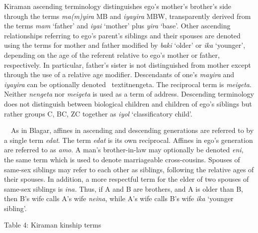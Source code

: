 Kiraman ascending terminology distinguishes ego{\textquoteright}s mother{\textquoteright}s brother{\textquoteright}s side through the terms \textit{ma(m)yira }MB and \textit{iyayira }MBW, transparently derived from the terms \textit{mam} {\textquoteleft}father{\textquoteright} and \textit{iyai }{\textquoteleft}mother{\textquoteright} plus \textit{yira }{\textquoteleft}base{\textquoteright}. Other ascending relationships referring to ego{\textquoteright}s parent{\textquoteright}s siblings and their spouses are denoted using the terms for mother and father modified by \textit{baki} {\textquoteleft}older{\textquoteright} or \textit{ika }{\textquoteleft}younger{\textquoteright}, depending on the age of the referent relative to ego{\textquoteright}s mother or father, respectively. In particular, father{\textquoteright}s sister is not distinguished from mother except through the use of a relative age modifier. Descendants of one{\textquoteright}s \textit{mayira }and \textit{iyayira} can be optionally denoted \
textit{nengeta}. The reciprocal term is \textit{meigeta}. Neither \textit{nengeta }nor \textit{meigeta} is used as a term of address. Descending terminology does not distinguish between biological children and children of ego{\textquoteright}s siblings but rather groups C, BC, ZC together as \textit{iyol }{\textquoteleft}classificatory child{\textquoteright}.

\ \ As in Blagar, affines in ascending and descending generations are referred to by a single term \textit{edat}. The term \textit{edat }is its own reciprocal. Affines in ego{\textquoteright}s generation are referred to as \textit{amo}. A man{\textquoteright}s brother-in-law may optionally be denoted \textit{eni}, the same term which is used to denote marriageable cross-cousins. Spouses of same-sex siblings may refer to each other as siblings, following the relative ages of their spouses. In addition, a more respectful term for the elder of two spouses of same-sex siblings is \textit{ina.} Thus, if A and B are brothers, and A is older than B, then B{\textquoteright}s wife calls A{\textquoteright}s wife \textit{neina}, while A{\textquoteright}s wife calls B{\textquoteright}s wife \textit{ika} {\textquoteleft}younger sibling{\textquoteright}. 

{\centering
Table 4: Kiraman kinship terms
\par}


